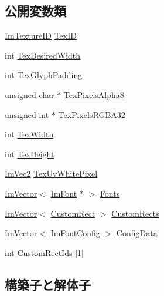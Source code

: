 \subsection*{公開変数類}
\begin{DoxyCompactItemize}
\item 
\mbox{\hyperlink{imgui_8h_a364f4447ecbc4ca176145ccff9db6286}{Im\+Texture\+ID}} \mbox{\hyperlink{struct_im_font_atlas_a1d7be9a6190c75706f80bda16c87f28e}{Tex\+ID}}
\item 
int \mbox{\hyperlink{struct_im_font_atlas_aa1d62d7da5633f894dbe881547e9de7c}{Tex\+Desired\+Width}}
\item 
int \mbox{\hyperlink{struct_im_font_atlas_a32034b2aac4616d8c27ee666a1fd1b62}{Tex\+Glyph\+Padding}}
\item 
unsigned char $\ast$ \mbox{\hyperlink{struct_im_font_atlas_a443ea9e7c4cf85ee791ffe891280eff3}{Tex\+Pixels\+Alpha8}}
\item 
unsigned int $\ast$ \mbox{\hyperlink{struct_im_font_atlas_a41163489a5b8060f405c56e22590cba5}{Tex\+Pixels\+R\+G\+B\+A32}}
\item 
int \mbox{\hyperlink{struct_im_font_atlas_a2d0662502433e7a87b3aa4681ba17aa3}{Tex\+Width}}
\item 
int \mbox{\hyperlink{struct_im_font_atlas_a5ef74d37ec01d9e8aac5c57433296ce3}{Tex\+Height}}
\item 
\mbox{\hyperlink{struct_im_vec2}{Im\+Vec2}} \mbox{\hyperlink{struct_im_font_atlas_af1d05221e9a1607d7f625df92a4f9b7e}{Tex\+Uv\+White\+Pixel}}
\item 
\mbox{\hyperlink{class_im_vector}{Im\+Vector}}$<$ \mbox{\hyperlink{struct_im_font}{Im\+Font}} $\ast$ $>$ \mbox{\hyperlink{struct_im_font_atlas_a0198aeb17ef8bb810ccc8db103b93b1f}{Fonts}}
\item 
\mbox{\hyperlink{class_im_vector}{Im\+Vector}}$<$ \mbox{\hyperlink{struct_im_font_atlas_1_1_custom_rect}{Custom\+Rect}} $>$ \mbox{\hyperlink{struct_im_font_atlas_a6289931d958f734fdc2ac1fadec99577}{Custom\+Rects}}
\item 
\mbox{\hyperlink{class_im_vector}{Im\+Vector}}$<$ \mbox{\hyperlink{struct_im_font_config}{Im\+Font\+Config}} $>$ \mbox{\hyperlink{struct_im_font_atlas_afa4f7459807763d032fe2d0022fc0823}{Config\+Data}}
\item 
int \mbox{\hyperlink{struct_im_font_atlas_a608ad12c2ccf1eed97b63454e52ccbe8}{Custom\+Rect\+Ids}} \mbox{[}1\mbox{]}
\end{DoxyCompactItemize}


\subsection{構築子と解体子}
\mbox{\label{struct_im_font_atlas_aa34e7909d30440d5c35aaef990ac741e}} 

